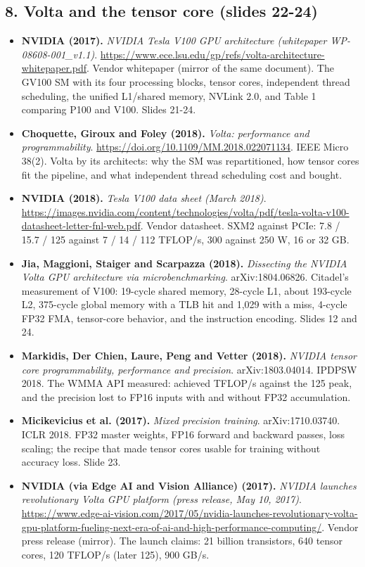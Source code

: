 \documentclass[11pt,letterpaper]{article}
\begin{document}
\subsection*{8. Volta and the tensor core (slides 22-24)}
\begin{itemize}[leftmargin=1.2em,itemsep=3pt]\sloppy
\item \textbf{NVIDIA (2017).} \textit{NVIDIA Tesla V100 GPU architecture (whitepaper WP-08608-001\_v1.1)}. \url{https://www.ece.lsu.edu/gp/refs/volta-architecture-whitepaper.pdf}. Vendor whitepaper (mirror of the same document). The GV100 SM with its four processing blocks, tensor cores, independent thread scheduling, the unified L1/shared memory, NVLink 2.0, and Table 1 comparing P100 and V100. Slides 21-24.
\item \textbf{Choquette, Giroux and Foley (2018).} \textit{Volta: performance and programmability}. \url{https://doi.org/10.1109/MM.2018.022071134}. IEEE Micro 38(2). Volta by its architects: why the SM was repartitioned, how tensor cores fit the pipeline, and what independent thread scheduling cost and bought.
\item \textbf{NVIDIA (2018).} \textit{Tesla V100 data sheet (March 2018)}. \url{https://images.nvidia.com/content/technologies/volta/pdf/tesla-volta-v100-datasheet-letter-fnl-web.pdf}. Vendor datasheet. SXM2 against PCIe: 7.8 / 15.7 / 125 against 7 / 14 / 112 TFLOP/s, 300 against 250 W, 16 or 32 GB.
\item \textbf{Jia, Maggioni, Staiger and Scarpazza (2018).} \textit{Dissecting the NVIDIA Volta GPU architecture via microbenchmarking}. arXiv:1804.06826. Citadel's measurement of V100: 19-cycle shared memory, 28-cycle L1, about 193-cycle L2, 375-cycle global memory with a TLB hit and 1,029 with a miss, 4-cycle FP32 FMA, tensor-core behavior, and the instruction encoding. Slides 12 and 24.
\item \textbf{Markidis, Der Chien, Laure, Peng and Vetter (2018).} \textit{NVIDIA tensor core programmability, performance and precision}. arXiv:1803.04014. IPDPSW 2018. The WMMA API measured: achieved TFLOP/s against the 125 peak, and the precision lost to FP16 inputs with and without FP32 accumulation.
\item \textbf{Micikevicius et al. (2017).} \textit{Mixed precision training}. arXiv:1710.03740. ICLR 2018. FP32 master weights, FP16 forward and backward passes, loss scaling; the recipe that made tensor cores usable for training without accuracy loss. Slide 23.
\item \textbf{NVIDIA (via Edge AI and Vision Alliance) (2017).} \textit{NVIDIA launches revolutionary Volta GPU platform (press release, May 10, 2017)}. \url{https://www.edge-ai-vision.com/2017/05/nvidia-launches-revolutionary-volta-gpu-platform-fueling-next-era-of-ai-and-high-performance-computing/}. Vendor press release (mirror). The launch claims: 21 billion transistors, 640 tensor cores, 120 TFLOP/s (later 125), 900 GB/s.
\end{itemize}
\end{document}
